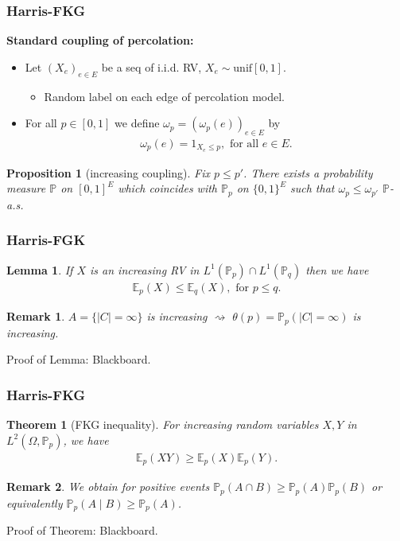 \documentclass[compress,mathserif,serif]{beamer}
\newtheorem{thm}{Theorem}
\newtheorem{Con}{Lemma}
\newtheorem{proposition}{Proposition}
\newtheorem{rem}{Remark}
\begin{document}
\begin{frame}
\frametitle{Harris-FKG}
\textbf{Standard coupling of percolation:}
\begin{itemize}
\item Let $(X_e)_{e \in E}$ be a seq of i.i.d. RV, $X_e \sim \text{unif}[0,1]$.
\begin{itemize}
\item Random label on each edge of percolation model.
\end{itemize}
\pause
\item For all $p \in [0,1]$ we define $\omega_p=(\omega_p(e))_{e \in E}$ by
\begin{align*}
\omega_p(e) = 1_{X_e \leq p }, \text{ for all } e \in E. 
\end{align*}
\end{itemize}
\pause
\begin{proposition}[increasing coupling] Fix $p \leq p'$. There exists a probability measure $\mathbb{P}$ on $[0,1]^E$ which coincides with $\mathbb{P}_p$ on $\{0,1\}^E$ such that $\omega_p \leq \omega_{p'}$ $\mathbb{P}$-a.s.
\end{proposition}
\end{frame}

\begin{frame}
\frametitle{Harris-FGK}
\begin{Con}If $X$ is an increasing RV in $L^1( \mathbb{P}_p) \cap L^1( \mathbb{P}_q)$ then we have \begin{align*}
\mathbb{E}_p(X) \leq \mathbb{E}_q(X), \text{ for } p \leq q. 
\end{align*}
\end{Con}
\pause
\begin{rem} $A= \{|C| = \infty\}$ is increasing $\rightsquigarrow$ $\theta(p)= \mathbb{P}_p(|C|= \infty)$ is increasing. 
\end{rem}
Proof of Lemma: Blackboard.
\end{frame}

\begin{frame}
\frametitle{Harris-FKG}
\begin{thm}[FKG inequality] For increasing random variables $X,Y$ in $L^2( \Omega, \mathbb{P}_p)$, we have
\begin{align*}
\mathbb{E}_p(XY) \geq \mathbb{E}_p(X) \mathbb{E}_p(Y).
\end{align*}
\end{thm}
\pause
\begin{rem} We obtain for positive events $\mathbb{P}_p(A \cap B) \geq \mathbb{P}_p(A) \mathbb{P}_p(B)$ or equivalently $\mathbb{P}_p(A \mid B) \geq \mathbb{P}_p(A)$. 
\end{rem}
Proof of Theorem: Blackboard.
\end{frame}
\end{document}
